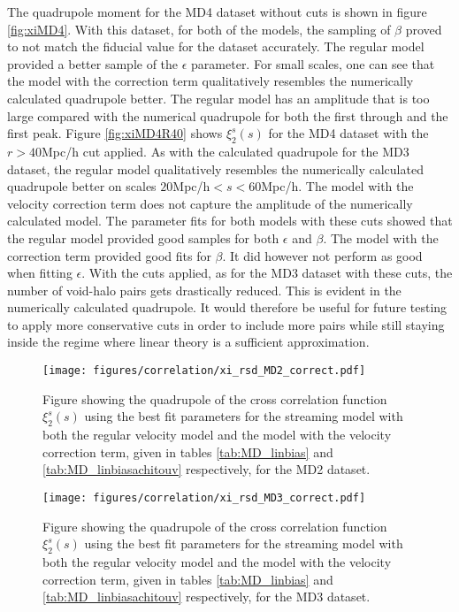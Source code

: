 The quadrupole moment for the MD4 dataset without cuts is shown in figure \ref{fig:xiMD4}. With this dataset, for both of the models, the sampling of $\beta$ proved to not match the fiducial value for the dataset accurately. The regular model provided a better sample of the $\epsilon$ parameter. For small scales, one can see that the model with the correction term qualitatively resembles the numerically calculated quadrupole better. The regular model has an amplitude that is too large compared with the numerical quadrupole for both the first through and the first peak. Figure \ref{fig:xiMD4R40} shows $\xi_2^s(s)$ for the MD4 dataset with the $r>40$Mpc/h cut applied. As with the calculated quadrupole for the MD3 dataset, the regular model qualitatively resembles the numerically calculated quadrupole better on scales $20$Mpc/h$<s<60$Mpc/h. The model with the velocity correction term does not capture the amplitude of the numerically calculated model. The parameter fits for both models with these cuts showed that the regular model provided good samples for both $\epsilon$ and $\beta$. The model with the correction term provided good fits for $\beta$. It did however not perform as good when fitting $\epsilon$. With the cuts applied, as for the MD3 dataset with these cuts, the number of void-halo pairs gets drastically reduced. This is evident in the numerically calculated quadrupole. It would therefore be useful for future testing to apply more conservative cuts in order to include more pairs while still staying inside the regime where linear theory is a sufficient approximation.
\begin{figure}[H]
    \texttt{[image: figures/correlation/xi\_rsd\_MD2\_correct.pdf]}
    \caption{Figure showing the quadrupole of the cross correlation function $\xi_2^s(s)$ using the best fit parameters for the streaming model with both the regular velocity model and the model with the velocity correction term, given in tables \ref{tab:MD_linbias} and \ref{tab:MD_linbiasachitouv} respectively, for the MD2 dataset.}
    \label{fig:xiMD2}
\end{figure}

\begin{figure}[H]
    \texttt{[image: figures/correlation/xi\_rsd\_MD3\_correct.pdf]}
    \caption{Figure showing the quadrupole of the cross correlation function $\xi_2^s(s)$ using the best fit parameters for the streaming model with both the regular velocity model and the model with the velocity correction term, given in tables \ref{tab:MD_linbias} and \ref{tab:MD_linbiasachitouv} respectively, for the MD3 dataset.}
    \label{fig:xiMD3}
\end{figure}

